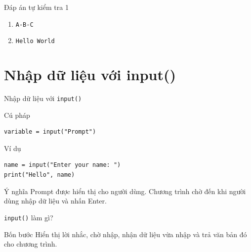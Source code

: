 \documentclass[aspectratio=169,10pt]{beamer}
\begin{document}
\begin{frame}{Đáp án tự kiểm tra 1}
\begin{enumerate}
  \item \texttt{A-B-C}
  \item \texttt{Hello World}
\end{enumerate}
\end{frame}

\section{Nhập dữ liệu với input()}

\begin{frame}[fragile]{Nhập dữ liệu với \texttt{input()}}
\begin{block}{Cú pháp}
\begin{lstlisting}
variable = input("Prompt")
\end{lstlisting}
\end{block}
\begin{exampleblock}{Ví dụ}
\begin{lstlisting}
name = input("Enter your name: ")
print("Hello", name)
\end{lstlisting}
\end{exampleblock}
\begin{alertblock}{Ý nghĩa}
Prompt được hiển thị cho người dùng. Chương trình chờ đến khi người dùng nhập dữ liệu và nhấn Enter.
\end{alertblock}
\end{frame}

\begin{frame}{\texttt{input()} làm gì?}
\begin{center}
\end{center}
\vspace{0.3cm}
\begin{block}{Bốn bước}
Hiển thị lời nhắc, chờ nhập, nhận dữ liệu vừa nhập và trả văn bản đó cho chương trình.
\end{block}
\end{frame}
\end{document}
